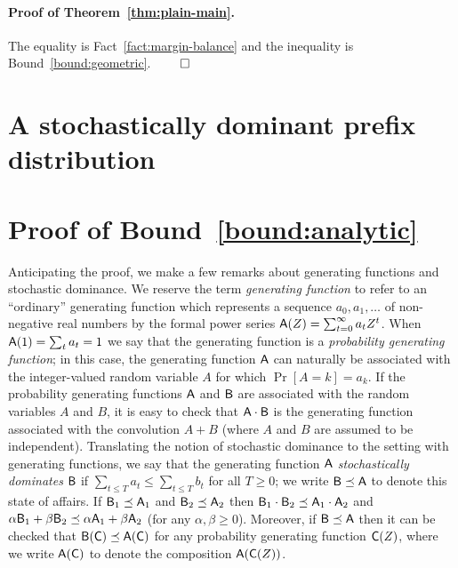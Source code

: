 \paragraph{Proof of Theorem~\ref{thm:plain-main}.}
The equality is Fact~\ref{fact:margin-balance} 
and the inequality is Bound~\ref{bound:geometric}. $\qed$





\section{A stochastically dominant prefix distribution}\label{sec:dominance-rho-stationary}
 

\section{Proof of Bound~\ref{bound:analytic}}\label{sec:gf-proof}

  Anticipating the proof, we make a few remarks about generating
  functions and stochastic dominance.  We reserve the term
  \emph{generating function} to refer to an ``ordinary'' generating
  function which represents a sequence $a_0, a_1, \ldots$ of
  non-negative real numbers by the formal power series
  $\mathsf{A}(Z) = \sum_{t = 0}^\infty a_t Z^t$. When
  $\mathsf{A}(1) = \sum_t a_t = 1$ we say that the generating function is
  a \emph{probability generating function}; in this case, the
  generating function $\mathsf{A}$ can naturally be associated with the
  integer-valued random variable $A$ for which $\Pr[A = k] = a_k$. If
  the probability generating functions $\mathsf{A}$ and $\mathsf{B}$ are
  associated with the random variables $A$ and $B$, it is easy to
  check that $\mathsf{A} \cdot \mathsf{B}$ is the generating function
  associated with the convolution $A + B$ (where $A$ and $B$ are
  assumed to be independent).  Translating the notion of stochastic
  dominance to the setting with generating functions, we say that the
  generating function $\mathsf{A}$ \emph{stochastically dominates}
  $\mathsf{B}$ if $\sum_{t \leq T} a_t \leq \sum_{t \leq T} b_t$ for all
  $T \geq 0$; we write $\mathsf{B} \preceq \mathsf{A}$ to denote this state of
  affairs. If $\mathsf{B}_1 \preceq \mathsf{A}_1$ and
  $\mathsf{B}_2 \preceq \mathsf{A}_2$ then
  $\mathsf{B}_1 \cdot \mathsf{B}_2 \preceq \mathsf{A}_1 \cdot \mathsf{A}_2$ and
  $\alpha \mathsf{B}_1 + \beta \mathsf{B}_2 \preceq \alpha \mathsf{A}_1 + \beta
  \mathsf{A}_2$ (for any $\alpha, \beta \geq 0$).  Moreover, if
  $\mathsf{B} \preceq \mathsf{A}$ then it can be checked that
  $\mathsf{B}(\mathsf{C}) \preceq \mathsf{A}(\mathsf{C})$ for any probability
  generating function $\mathsf{C}(Z)$, where we write $\mathsf{A}(\mathsf{C})$ to
  denote the composition $\mathsf{A}(\mathsf{C}(Z))$.


